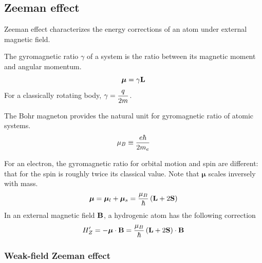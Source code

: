 \subsection{Zeeman effect}
Zeeman effect characterizes the energy corrections of an atom under external magnetic field. 
\begin{definition}
    The gyromagnetic ratio $\gamma$ of a system is the ratio between its magnetic moment and angular momentum. 
    \[ 
        \bm \mu = \gamma \mathbf L
    \] 
    For a classically rotating body, $\gamma = \dfrac q{2m}$. 
\end{definition}
\begin{definition}
    The Bohr magneton provides the natural unit for gyromagnetic ratio of atomic systems. 
    \[ 
        \mu_B \equiv \dfrac {e\hbar}{2m_e}
    \] 
\end{definition}

For an electron, the gyromagnetic ratio for orbital motion and spin are different: that for the spin is roughly 
twice its classical value. Note that $\bm \mu$ scales inversely with mass. 
\begin{equation}
    \bm \mu = \bm \mu_l + \bm \mu_s = \dfrac {\mu_B}{\hbar}\left(\mathbf L + 2\mathbf S\right)
\end{equation}
In an external magnetic field $\mathbf B$, a hydrogenic atom has the following correction 
\begin{equation}
    H'_Z = -\bm \mu \cdot \mathbf B=\dfrac {\mu_B} {\hbar}\left(\mathbf L + 2\mathbf S\right)\cdot \mathbf B
\end{equation}

\subsubsection{Weak-field Zeeman effect}

